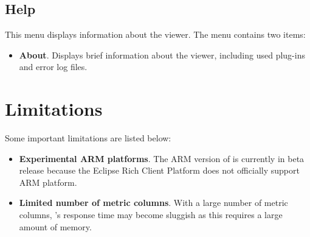 \subsection{Help}

This menu displays information about the viewer. The menu contains two items:
\begin{itemize}

\item \textbf{About}.
  Displays brief information about the viewer, including used plug-ins and error log files.

\end{itemize}



\section{Limitations}

Some important \hpcviewer{} limitations are listed below:
\begin{itemize}

\item \textbf{Experimental ARM platforms}.
The ARM version of \hpcviewer{} is currently in beta release because the Eclipse Rich Client Platform does not officially support ARM platform.

\item \textbf{Limited number of metric columns}.
With a large number of metric columns, \hpcviewer{}'s response time may become sluggish as this requires a large amount of memory.


\end{itemize}
